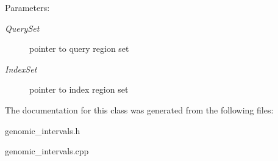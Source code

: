 \begin{Desc}
\item[Parameters:]
\begin{description}
\item[{\em QuerySet}]pointer to query region set \item[{\em IndexSet}]pointer to index region set \end{description}
\end{Desc}


The documentation for this class was generated from the following files:\begin{CompactItemize}
\item 
genomic\_\-intervals.h\item 
genomic\_\-intervals.cpp\end{CompactItemize}
